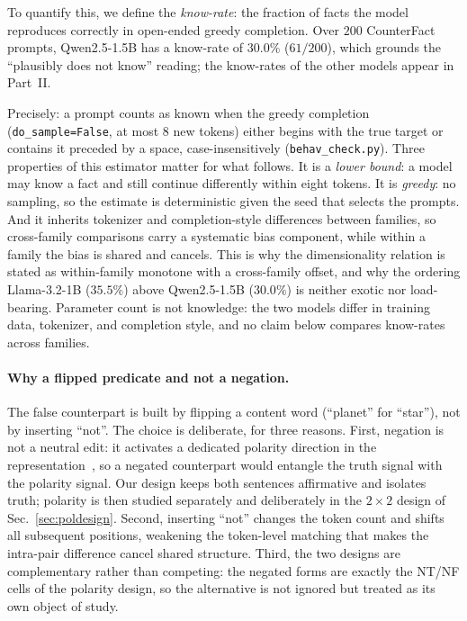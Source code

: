 \documentclass[11pt]{article}
\begin{document}
To quantify this, we define the \emph{know-rate}: the fraction of facts the
model reproduces correctly in open-ended greedy completion. Over $200$
CounterFact prompts, Qwen2.5-1.5B has a know-rate of $30.0\%$ ($61/200$),
which grounds the ``plausibly does not know'' reading; the know-rates of the
other models appear in Part~II.

Precisely: a prompt counts as known when the greedy completion
(\texttt{do\_sample=False}, at most $8$ new tokens) either begins with the
true target or contains it preceded by a space, case-insensitively
(\texttt{behav\_check.py}). Three properties of this estimator matter for
what follows. It is a \emph{lower bound}: a model may know a fact and
still continue differently within eight tokens. It is \emph{greedy}: no
sampling, so the estimate is deterministic given the seed that selects the
prompts. And it inherits tokenizer and completion-style differences
between families, so cross-family comparisons carry a systematic bias
component, while within a family the bias is shared and cancels. This is
why the dimensionality relation is stated as within-family monotone with a
cross-family offset, and why the ordering Llama-3.2-1B ($35.5\%$) above
Qwen2.5-1.5B ($30.0\%$) is neither exotic nor load-bearing. Parameter
count is not knowledge: the two models differ in training data, tokenizer,
and completion style, and no claim below compares know-rates across
families.



\paragraph{Why a flipped predicate and not a negation.} The false counterpart
is built by flipping a content word (``planet'' for ``star''), not by
inserting ``not''. The choice is deliberate, for three reasons. First,
negation is not a neutral edit: it activates a dedicated polarity direction in
the representation~\cite{burger2024}, so a negated counterpart would entangle
the truth signal with the polarity signal. Our design keeps both sentences
affirmative and isolates truth; polarity is then studied separately and
deliberately in the $2{\times}2$ design of Sec.~\ref{sec:poldesign}. Second,
inserting ``not'' changes the token count and shifts all subsequent positions,
weakening the token-level matching that makes the intra-pair difference
cancel shared structure. Third, the two designs are complementary rather than
competing: the negated forms are exactly the NT/NF cells of the polarity
design, so the alternative is not ignored but treated as its own object of
study.
\end{document}
